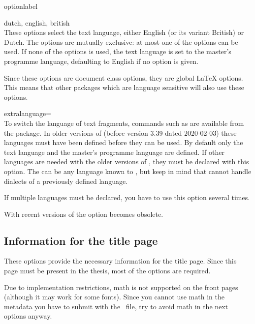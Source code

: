 \begin{labelled}{optionlabel}
\item[dutch, english, british]\\
  These options select the text language, either English (or its variant
  British) or Dutch. The options are mutually exclusive: at most one of the
  options can be used. If none of the options is used, the text language is set
  to the master's programme language, defaulting to English if no 
  option is given.

  Since these options are document class options, they are global LaTeX
  options. This means that other packages which are language sensitive will
  also use these options.

\item[extralanguage=\meta{lang}]\\
  To switch the language of text fragments, commands such as
   are available from the  package. In older
  versions of  (before version 3.39 dated 2020-02-03) these
  languages must have been defined before they can be used. By default only the
  text language and the master's programme language are defined. If other
  languages are needed with the older versions of , they must be
  declared with this  option. The  can be any
  language known to , but keep in mind that  cannot
  handle dialects of a previously defined language.

  If multiple languages must be declared, you have to use this option
  several times.

  With recent versions of  the  option becomes
  obsolete.
\end{labelled}

\subsection{Information for the title page}
These options provide the necessary information for the title page. Since this
page must be present in the thesis, most of the options are required.

Due to implementation restrictions, math is not supported on the front pages
(although it may work for some fonts). Since you cannot use math in the
metadata you have to submit with the \PDF~file, try to avoid math in the
next options anyway.

